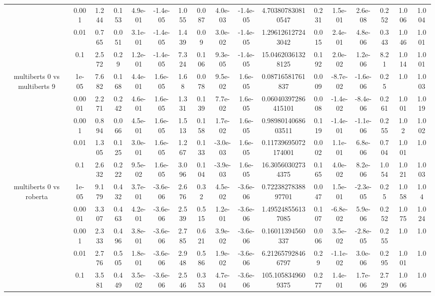 \begin{tabular}{|c|c|c|c|c|c|c|c|c|c|c|c|c|c|c|c|c|}
 & 0.001 & 1.244 & 0.153 & 4.9e-01 & -1.4e-05 & 1.055 & 0.087 & 4.0e-03 & -1.4e-05 & 4.703807830810547 & 0.231 & 1.5e-01 & 2.6e-08 & 0.252 & 1.006 & 1.004 \\
 & 0.01 & 0.765 & 0.051 & 3.1e-01 & -1.4e-05 & 1.439 & 0.09 & 3.0e-02 & -1.4e-05 & 1.296126127243042 & 0.015 & 2.4e-01 & 4.8e-06 & 0.343 & 1.046 & 1.001 \\
 & 0.1 & 2.572 & 0.29 & 1.2e-01 & -1.4e-05 & 7.324 & 0.106 & 9.3e-05 & -1.4e-05 & 15.04620361328125 & 0.192 & 2.0e-02 & 1.2e-06 & 8.21 & 1.014 & 1.001 \\
\hline
\multirow{5}{*}{multiberts 0 vs multiberts 9} & 1e-05 & 7.682 & 0.168 & 4.4e-01 & 1.6e-05 & 1.68 & 0.078 & 9.5e-02 & 1.6e-05 & 0.08716581761837 & 0.009 & -8.7e-02 & -1.6e-06 & 0.25 & 1.0 & 1.003 \\
 & 0.0001 & 2.271 & 0.242 & 4.6e-01 & 1.6e-05 & 1.331 & 0.139 & 7.7e-02 & 1.6e-05 & 0.06040397286415101 & 0.008 & -1.4e-02 & -8.4e-06 & 0.261 & 1.001 & 1.019 \\
 & 0.001 & 0.894 & 0.066 & 4.5e-01 & 1.6e-05 & 1.513 & 0.158 & 1.7e-02 & 1.6e-05 & 0.9898014068603511 & 0.119 & -1.4e-01 & -1.1e-06 & 0.255 & 1.02 & 1.002 \\
 & 0.01 & 1.305 & 0.125 & 3.0e-01 & 1.6e-05 & 1.267 & 0.133 & -3.0e-03 & 1.6e-05 & 0.11739695072174001 & 0.002 & 1.1e-01 & 6.8e-06 & 0.704 & 1.001 & 1.0 \\
 & 0.1 & 2.632 & 0.222 & 9.5e-02 & 1.6e-05 & 3.096 & 0.104 & -3.9e-03 & 1.6e-05 & 16.30560302734375 & 0.165 & 4.0e-02 & 8.2e-06 & 1.054 & 1.021 & 1.003 \\
\hline
\multirow{5}{*}{multiberts 0 vs roberta } & 1e-05 & 9.179 & 0.432 & 3.7e-01 & -3.6e-06 & 2.676 & 0.32 & 4.5e-02 & -3.6e-06 & 0.7223827838897701 & 0.047 & 1.5e-01 & -2.3e-05 & 0.25 & 1.058 & 1.04 \\
 & 0.0001 & 3.307 & 0.463 & 4.2e-01 & -3.6e-06 & 2.539 & 0.515 & 1.2e-01 & -3.6e-06 & 1.495248556137085 & 0.107 & -6.8e-02 & 5.9e-06 & 0.252 & 1.075 & 1.024 \\
 & 0.001 & 2.333 & 0.496 & 3.8e-01 & -3.6e-06 & 2.785 & 0.621 & 3.9e-02 & -3.6e-06 & 0.16011394560337 & 0.006 & 3.5e-02 & -2.8e-05 & 0.255 & 1.0 & 1.0 \\
 & 0.01 & 2.776 & 0.505 & 1.8e-01 & -3.6e-06 & 2.948 & 0.586 & 1.9e-02 & -3.6e-06 & 6.212657928466797 & 0.29 & -1.1e-02 & 3.0e-06 & 0.295 & 1.001 & 1.0 \\
 & 0.1 & 3.581 & 0.449 & 3.5e-02 & -3.6e-06 & 2.546 & 0.353 & 4.7e-04 & -3.6e-06 & 105.1058349609375 & 0.277 & 1.4e-01 & 1.7e-06 & 2.729 & 1.006 & 1.0 \\

\end{tabular}
